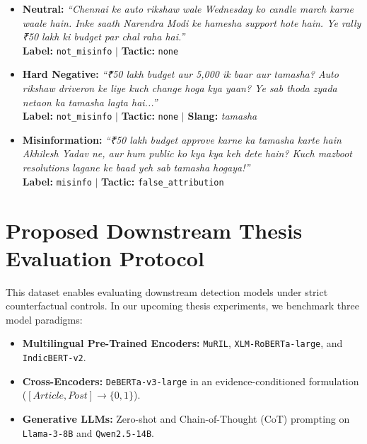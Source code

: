 \documentclass[11pt,a4paper]{article}
\begin{document}
\begin{itemize}[leftmargin=*,noitemsep]
    \item \textbf{Neutral:} \textit{``Chennai ke auto rikshaw wale Wednesday ko candle march karne waale hain. Inke saath Narendra Modi ke hamesha support hote hain. Ye rally ₹50 lakh ki budget par chal raha hai.''} \\
    \textbf{Label:} \texttt{not\_misinfo} $|$ \textbf{Tactic:} \texttt{none}
    
    \item \textbf{Hard Negative:} \textit{``₹50 lakh budget aur 5,000 ik baar aur tamasha? Auto rikshaw driveron ke liye kuch change hoga kya yaan? Ye sab thoda zyada netaon ka tamasha lagta hai...''} \\
    \textbf{Label:} \texttt{not\_misinfo} $|$ \textbf{Tactic:} \texttt{none} $|$ \textbf{Slang:} \textit{tamasha}
    
    \item \textbf{Misinformation:} \textit{``₹50 lakh budget approve karne ka tamasha karte hain Akhilesh Yadav ne, aur hum public ko kya kya keh dete hain? Kuch mazboot resolutions lagane ke baad yeh sab tamasha hogaya!''} \\
    \textbf{Label:} \texttt{misinfo} $|$ \textbf{Tactic:} \texttt{false\_attribution}
\end{itemize}

\section{Proposed Downstream Thesis Evaluation Protocol}
This dataset enables evaluating downstream detection models under strict counterfactual controls. In our upcoming thesis experiments, we benchmark three model paradigms:
\begin{itemize}[noitemsep]
    \item \textbf{Multilingual Pre-Trained Encoders:} \texttt{MuRIL}, \texttt{XLM-RoBERTa-large}, and \texttt{IndicBERT-v2}.
    \item \textbf{Cross-Encoders:} \texttt{DeBERTa-v3-large} in an evidence-conditioned formulation ($[Article, Post] \rightarrow \{0, 1\}$).
    \item \textbf{Generative LLMs:} Zero-shot and Chain-of-Thought (CoT) prompting on \texttt{Llama-3-8B} and \texttt{Qwen2.5-14B}.
\end{itemize}
\end{document}
